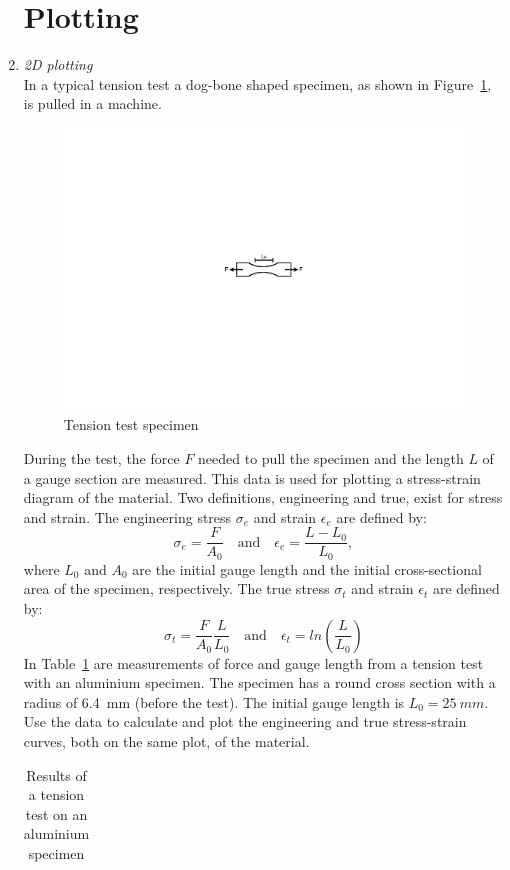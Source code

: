 \begin{enumerate}
\section{Plotting} \label{sect:plotting}
\item \textit{2D plotting}\\
In a typical tension test a dog-bone shaped specimen, as shown in Figure~\ref{fig:tension-test}, is pulled in a machine. 
\begin{figure}[h]
	\myfloatalign
	\includegraphics[width=0.45\linewidth]{Graphics/Additional-Ex/tension-test}
	\caption{Tension test specimen}
	\label{fig:tension-test}
\end{figure}
During the test, the force $F$ needed to pull the specimen and the length $L$ of a gauge section are measured. This data is used for plotting a stress-strain diagram of the material. Two definitions, engineering and true, exist for stress and strain. The engineering stress $\sigma_e$ and strain $\epsilon_e$ are defined by:
\begin{equation*}
\sigma_e = \frac{F}{A_0} \quad \textrm{and} \quad  \epsilon_e = \frac{L-L_0}{L_0},
\end{equation*}
where $L_0$ and $A_0$ are the initial gauge length and the initial cross-sectional area of the specimen, respectively. The true stress $\sigma_t$ and strain $\epsilon_t$ are defined by:
\begin{equation*}
\sigma_t = \frac{F}{A_0} \frac{L}{L_0} \quad \textrm{and} \quad \epsilon_t = ln \left( \frac{L}{L_0} \right)
\end{equation*}
In Table~\ref{tab:tension} are measurements of force and gauge length from a tension test with an aluminium specimen. The specimen has a round cross section with a radius of 6.4~mm (before the test). The initial gauge length is $L_0 = 25~mm$. Use the data to calculate and plot the engineering and true stress-strain curves, both on the same plot, of the material.
\begin{table}[h]
	\caption{Results of a tension test on an aluminium specimen}
	\label{tab:tension}
	\myfloatalign
	\begin{tabular}{lcccccccc}\toprule

\end{tabular}
\end{table}
\end{enumerate}
